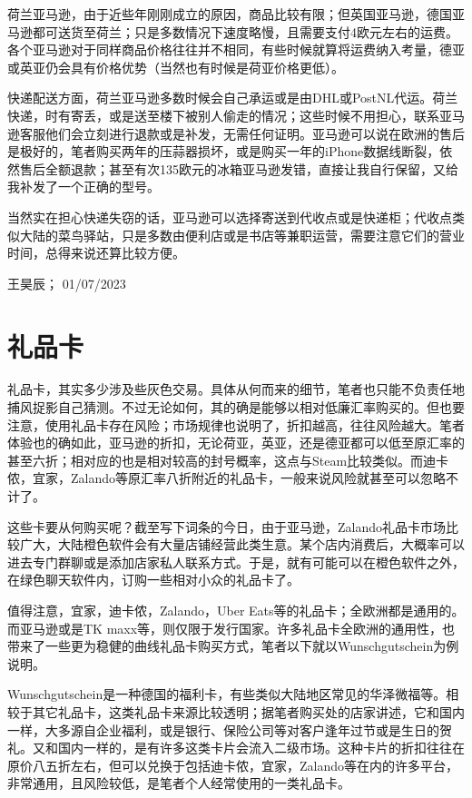 荷兰亚马逊，由于近些年刚刚成立的原因，商品比较有限；但英国亚马逊，德国亚马逊都可送货至荷兰；只是多数情况下速度略慢，且需要支付4欧元左右的运费。各个亚马逊对于同样商品价格往往并不相同，有些时候就算将运费纳入考量，德亚或英亚仍会具有价格优势（当然也有时候是荷亚价格更低）。

快递配送方面，荷兰亚马逊多数时候会自己承运或是由DHL或PostNL代运。荷兰快递，时有寄丢，或是送至楼下被别人偷走的情况；这些时候不用担心，联系亚马逊客服他们会立刻进行退款或是补发，无需任何证明。亚马逊可以说在欧洲的售后是极好的，笔者购买两年的压蒜器损坏，或是购买一年的iPhone数据线断裂，依然售后全额退款；甚至有次135欧元的冰箱亚马逊发错，直接让我自行保留，又给我补发了一个正确的型号。

当然实在担心快递失窃的话，亚马逊可以选择寄送到代收点或是快递柜；代收点类似大陆的菜鸟驿站，只是多数由便利店或是书店等兼职运营，需要注意它们的营业时间，总得来说还算比较方便。
\begin{flushright}
王昊辰； 01/07/2023
\end{flushright}

\vspace{\betsubsec} %


\section{礼品卡}\hypertarget{礼品卡}{} 
礼品卡，其实多少涉及些灰色交易。具体从何而来的细节，笔者也只能不负责任地捕风捉影自己猜测。不过无论如何，其的确是能够以相对低廉汇率购买的。但也要注意，使用礼品卡存在风险；市场规律也说明了，折扣越高，往往风险越大。笔者体验也的确如此，亚马逊的折扣，无论荷亚，英亚，还是德亚都可以低至原汇率的甚至六折；相对应的也是相对较高的封号概率，这点与Steam比较类似。而迪卡侬，宜家，Zalando等原汇率八折附近的礼品卡，一般来说风险就甚至可以忽略不计了。

这些卡要从何购买呢？截至写下词条的今日，由于亚马逊，Zalando礼品卡市场比较广大，大陆橙色软件会有大量店铺经营此类生意。某个店内消费后，大概率可以进去专门群聊或是添加店家私人联系方式。于是，就有可能可以在橙色软件之外，在绿色聊天软件内，订购一些相对小众的礼品卡了。

值得注意，宜家，迪卡侬，Zalando，Uber Eats等的礼品卡；全欧洲都是通用的。而亚马逊或是TK maxx等，则仅限于发行国家。许多礼品卡全欧洲的通用性，也带来了一些更为稳健的曲线礼品卡购买方式，笔者以下就以Wunschgutschein为例说明。

Wunschgutschein是一种德国的福利卡，有些类似大陆地区常见的华泽微福等。相较于其它礼品卡，这类礼品卡来源比较透明；据笔者购买处的店家讲述，它和国内一样，大多源自企业福利，或是银行、保险公司等对客户逢年过节或是生日的贺礼。又和国内一样的，是有许多这类卡片会流入二级市场。这种卡片的折扣往往在原价八五折左右，但可以兑换于包括迪卡侬，宜家，Zalando等在内的许多平台，非常通用，且风险较低，是笔者个人经常使用的一类礼品卡。

